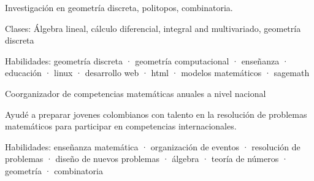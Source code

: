 \documentclass[]{plushcv}
\begin{document}
\begin{minipage}[t]{0.70\textwidth}

\sectionsep
{}
\begin{tightemize}
  \sectionsep
\item Investigación en geometría discreta, politopos, combinatoria.
\item Clases: Álgebra lineal, cálculo diferencial, integral and multivariado, geometría discreta
\item Habilidades:  geometría discreta · geometría computacional  · enseñanza · educación  · linux · desarrollo web · html · modelos matemáticos · sagemath%
\end{tightemize}
\sectionsep

\begin{tightemize}
  \sectionsep
\item Coorganizador de competencias matemáticas anuales a nivel nacional
\item Ayudé a preparar jovenes colombianos con talento en la resolución de problemas matemáticos para participar en competencias internacionales.
  
\item Habilidades: enseñanza matemática  · organización de eventos  · resolución de problemas  · diseño de nuevos problemas · álgebra  · teoría de números · geometría  · combinatoria
\end{tightemize}







\end{minipage}
\end{document}
